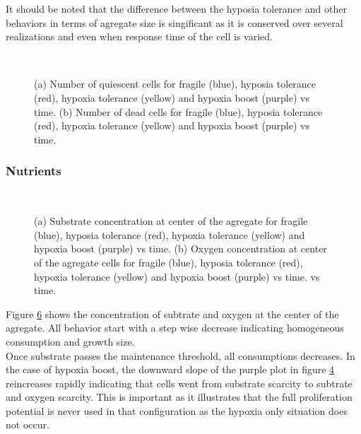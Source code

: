 \documentclass[11pt,a4paper]{article}
\begin{document}
It should be noted that the difference between the hyposia tolerance and other behaviors in terms of agregate size is singificant as it is conserved over several realizations and even when response time of the cell is varied.\\

\begin{figure}[h]
\begin{subfigure}{0.5\textwidth}
	\centering
	
	\caption{ \label{OS_quiesc}}
\end{subfigure}
~~
\begin{subfigure}{0.5\textwidth}
	\centering
	
	\caption{\label{OS_dead}}
\end{subfigure}
\caption{(a) Number of quiescent cells for fragile (blue), hyposia tolerance (red), hypoxia tolerance (yellow) and hypoxia boost (purple) vs time. (b) Number of dead cells for fragile (blue), hyposia tolerance (red), hypoxia tolerance (yellow) and hypoxia boost (purple) vs time. \label{OS_quiesc_dead}}
\end{figure}


\subsubsection{Nutrients}
\begin{figure}[h]
\begin{subfigure}{0.5\textwidth}
	\centering
	
	\caption{ \label{OS_S_ctr}}
\end{subfigure}
~~
\begin{subfigure}{0.5\textwidth}
	\centering
	
	\caption{\label{OS_O_ctr}}
\end{subfigure}
\caption{(a) Substrate concentration at center of the agregate for fragile (blue), hyposia tolerance (red), hypoxia tolerance (yellow) and hypoxia boost (purple) vs time. (b) Oxygen concentration at center of the agregate cells for fragile (blue), hyposia tolerance (red), hypoxia tolerance (yellow) and hypoxia boost (purple) vs time. vs time. \label{OS_SO_ctr}}
\end{figure}

Figure \ref{OS_SO_ctr} shows the concentration of subtrate and oxygen at the center of the agregate. All behavior start with a step wise decrease indicating homogeneous consumption and growth size.\\

Once substrate passes the maintenance threshold, all consumptions decreases. In the case of hypoxia boost, the downward slope of the purple plot in figure \ref{OS_S_ctr} reincreases rapidly indicating that cells went from substrate scarcity to subtrate and oxygen scarcity. This is important as it illustrates that the full proliferation potential is never used in that configuration as the hypoxia only situation does not occur.\\
\end{document}
